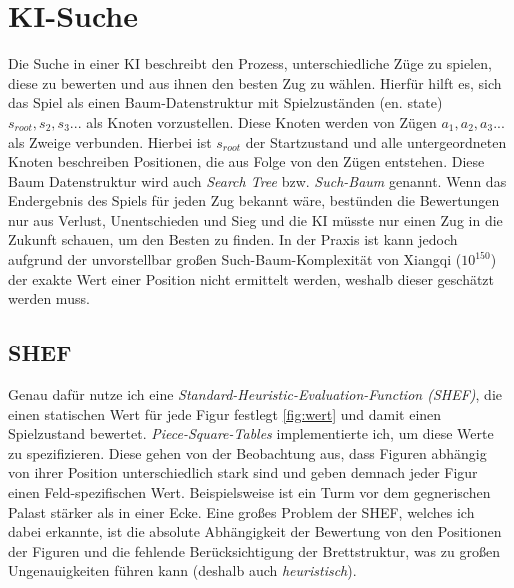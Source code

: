 \documentclass{jpp}
\begin{document}
\section{KI-Suche}
Die Suche in einer KI beschreibt den Prozess, unterschiedliche Züge zu spielen, diese zu bewerten und aus ihnen den besten Zug zu wählen. Hierfür hilft es, sich das Spiel als einen Baum-Datenstruktur mit Spielzuständen (en. state) {$s_{root}, s_2, s_3 ...$} als Knoten vorzustellen. Diese Knoten werden von Zügen {$a_1, a_2, a_3 ...$} als Zweige verbunden. Hierbei ist $s_{root}$ der Startzustand und alle untergeordneten Knoten beschreiben Positionen, die aus Folge von den Zügen entstehen. Diese Baum Datenstruktur wird auch \textit{Search Tree} bzw. \textit{Such-Baum} genannt. 
Wenn das Endergebnis des Spiels für jeden Zug bekannt wäre, bestünden die Bewertungen nur aus Verlust, Unentschieden und Sieg und die KI müsste nur einen Zug in die Zukunft schauen, um den Besten zu finden. In der Praxis ist kann jedoch aufgrund der unvorstellbar großen Such-Baum-Komplexität von Xiangqi ($10^{150}$) der exakte Wert einer Position nicht ermittelt werden, weshalb dieser geschätzt werden muss.

\subsection{SHEF}
Genau dafür nutze ich eine \textit{Standard-Heuristic-Evaluation-Function (SHEF)}, die einen statischen Wert für jede Figur festlegt \ref{fig:wert} und damit einen Spielzustand bewertet.
\textit{Piece-Square-Tables} implementierte ich, um diese Werte zu spezifizieren. Diese gehen von der Beobachtung aus, dass Figuren abhängig von ihrer Position unterschiedlich stark sind und geben demnach jeder Figur einen Feld-spezifischen Wert. Beispielsweise ist ein Turm vor dem gegnerischen Palast stärker als in einer Ecke. Eine großes Problem der SHEF, welches ich dabei erkannte, ist die absolute Abhängigkeit der Bewertung von den Positionen der Figuren und die fehlende Berücksichtigung der Brettstruktur, was zu großen Ungenauigkeiten führen kann (deshalb auch \textit{heuristisch}).
\end{document}
